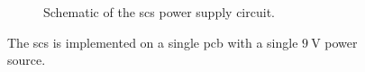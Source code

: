 \documentclass[class=report,11pt,crop=false]{standalone}
\begin{document}
\begin{figure}[ht!]
\begin{subfigure}{.5\textwidth}
			\caption{Schematic of the \acrshort{scs} power supply circuit.}
			\label{fig:scs-power-schematic}
		\end{subfigure}
		\caption{The \acrshort{scs} is implemented on a single \acrshort{pcb} with a single $\SI{9}{\volt}$ power source.}
		\label{fig:scs-full-subsystem}
	\end{figure}
	
	\ifstandalone
	
	\printnoidxglossary[type=\acronymtype,nonumberlist]
	\fi
\end{document}
